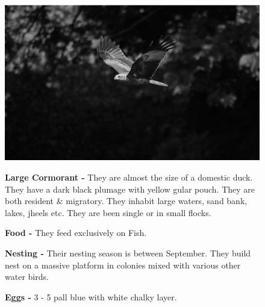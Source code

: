 \begin{figure}[H]
\begin{center}
\includegraphics{figure/Land_birds/01_pariah_kite/pariah-kite.eps}
\end{center}
\medskip
\noindent
{\bf Large Cormorant -} They are almost the size of a domestic duck. They have a dark black plumage with yellow gular pouch. They are both resident \& migratory. They inhabit large waters, sand bank, lakes, jheels etc. They are been single or in small flocks.

\medskip
{\bf Food -} They feed exclusively on Fish.

{\bf Nesting -} Their nesting season is between September. They build nest on a massive platform in colonies mixed with various other water birds. 

{\bf Eggs -} 3 - 5 pall blue with white chalky layer. 
\end{figure}

\vfill\eject

~\phantom{a}
\vfill


